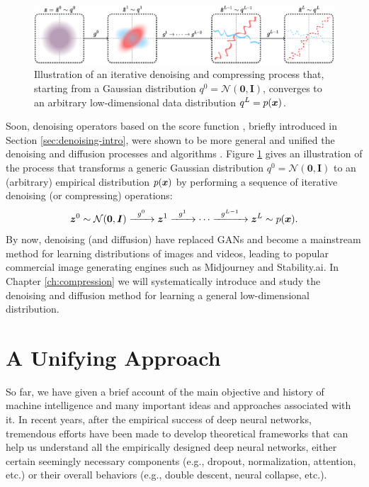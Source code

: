 \documentclass[../../book-main.tex]{subfiles}
\begin{document}
\begin{figure}[t]
    \centering
    \includegraphics[width=\linewidth]{figures/diffusion_pipeline-2.pdf}
    \caption{Illustration of an iterative denoising and compressing process that, starting from a Gaussian distribution $q^0 = \mathcal{N}(\boldsymbol{0}, \boldsymbol{I})$, converges to an arbitrary low-dimensional data distribution $q^L = p(\bm{x})$. }
    \label{fig:diffusion}
\end{figure}

Soon, denoising operators based on the score function \cite{hyvarinen05a}, briefly introduced in Section \ref{sec:denoising-intro}, were shown to be more general and unified the denoising and diffusion processes and algorithms \cite{song2019,song2020score,ho2020denoising}. Figure \ref{fig:diffusion} gives an illustration of the process that transforms a generic Gaussian distribution $q^0 = \mathcal{N}(\boldsymbol{0}, \boldsymbol{I})$ to an (arbitrary) empirical distribution $p(\bm{x})$ by performing a sequence of iterative denoising (or compressing) operations:
\begin{equation}
        \bm{z}^0 \sim  \mathcal{N}(\boldsymbol{0}, \boldsymbol{I})\xrightarrow{\hspace{2mm} g^0  \hspace{2mm}} \bm{z}^1 \xrightarrow{\hspace{2mm} g^1 \hspace{2mm}} \cdots \xrightarrow{\hspace{2mm} g^{L-1}  \hspace{2mm}} \bm{z}^L \sim p(\bm{x}).
\end{equation}
By now, denoising (and diffusion) have replaced GANs and become a mainstream method for learning distributions of images and videos, leading to popular commercial image generating engines such as Midjourney and Stability.ai. 
In Chapter \ref{ch:compression} we will systematically introduce and study the denoising and diffusion method for learning a general low-dimensional distribution.  



\section{A Unifying Approach}\label{sec:unifying-approach}
So far, we have given a brief account of the main objective and history of machine intelligence and many important ideas and approaches associated with it. In recent years, after the empirical success of deep neural networks, tremendous efforts have been made to develop theoretical frameworks that can help us understand all the empirically designed deep neural networks, either certain seemingly necessary components (e.g., dropout,  normalization, attention, etc.) or their overall behaviors (e.g., double descent, neural collapse,  etc.). 
\end{document}
